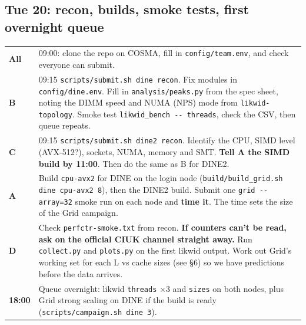 \documentclass[10pt,a4paper]{article}
\newcommand{\who}[1]{\textbf{\color{accent}#1}}
\newcommand{\deadline}[1]{\textbf{\color{red!70!black}#1}}
\begin{document}
\subsection*{Tue 20: recon, builds, smoke tests, first overnight queue}
\begin{tabularx}{\linewidth}{@{}l L@{}}
\toprule
\who{All} & 09:00: clone the repo on COSMA, fill in \texttt{config/team.env}, and check everyone can submit.\\
\who{B} & 09:15 \texttt{scripts/submit.sh dine recon}. Fix modules in \texttt{config/dine.env}. Fill in \texttt{analysis/peaks.py} from the spec sheet, noting the DIMM speed and NUMA (NPS) mode from \texttt{likwid-topology}. Smoke test \texttt{likwid\_bench -{}- threads}, check the CSV, then queue repeats.\\
\who{C} & 09:15 \texttt{scripts/submit.sh dine2 recon}. Identify the CPU, SIMD level (AVX-512?), sockets, NUMA, memory and SMT. \deadline{Tell A the SIMD build by 11:00}. Then do the same as B for DINE2.\\
\who{A} & Build \texttt{cpu-avx2} for DINE on the login node (\texttt{build/build\_grid.sh dine cpu-avx2 8}), then the DINE2 build. Submit one \texttt{grid -{}-array=32} smoke run on each node and \textbf{time it}. The time sets the size of the Grid campaign.\\
\who{D} & Check \texttt{perfctr-smoke.txt} from recon. \textbf{If counters can't be read, ask on the official CIUK channel straight away.} Run \texttt{collect.py} and \texttt{plots.py} on the first likwid output. Work out Grid's working set for each L vs cache sizes (see \S6) so we have predictions before the data arrives.\\
\textbf{18:00} & Queue overnight: likwid \texttt{threads} $\times$3 and \texttt{sizes} on both nodes, plus Grid strong scaling on DINE if the build is ready (\texttt{scripts/campaign.sh dine 3}).\\
\bottomrule
\end{tabularx}
\end{document}
